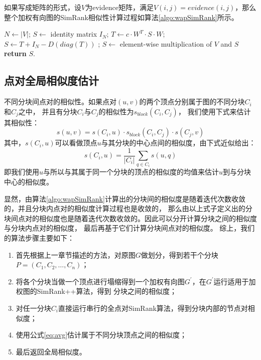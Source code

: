 \documentclass[master]{njuthesis}
\begin{document}
如果写成矩阵的形式，设$V$为evidence矩阵，满足$V(i,j)=evidence(i,j)$，那么整个加权有向图的SimRank相似性计算过程如算法\ref{algo:wapSimRank}所示。
\begin{algorithm}[h]
\label{algo:wapSimRank}
\begin{algorithmic}[1]
	\State $N \gets |V|$;
	\State $S \gets$ identity matrix $I_N$;
		\State $T \gets c\cdot W^T \cdot S \cdot W$;
		\State $S \gets T + I_N -D(diag(T))$ ;
	\EndFor
	\State $S \gets$ element-wise multiplication of $V$ and $S$
	\State \textbf{return} $S$.
\EndProcedure
\end{algorithmic}
\end{algorithm}
\subsection{点对全局相似度估计}

\begin{definition}
 不同分块间点对的相似性。如果点对$(u,v)$的两个顶点分别属于图的不同分块$C_i$和$C_j$之中，
 并且有分块$C_i$与$C_j$的相似性为$s_{block}(C_i, C_j)$，
 我们使用下式来估计其相似性：
 \begin{equation}
 \label{eq:avg}
    s(u,v) = s(C_i, u) \cdot s_{block}(C_i, C_j) \cdot s(C_j, v)
   \end{equation}
  其中，$s(C_i, u)$可以看做顶点$u$与其分块的中心点间的相似度，由下式近似给出：
  \begin{equation}
    s(C_i, u) = \frac{1}{|C_i|}\sum_{q \in C_i}{s(u,q)}
   \end{equation}
   即我们使用$u$与所以与其属于同一个分块的顶点的相似度的均值来估计$u$到与分块中心的相似度。
\end{definition}
显然，由算法\ref{algo:wapSimRank}计算出的分块间的相似度是随着迭代次数收敛的，并且分块内点对的相似度计算过程也是收敛的，
那么由以上式子定义出的分块间点对的相似度也是随着迭代次数收敛的。因此可以分开计算分块之间的相似度与分块内点对的相似度，
最后再基于它们计算分块间点对的相似度。
综上，我们的算法步骤主要如下：
\begin{enumerate}
 \item 首先根据上一章节描述的方法，对原图$G$做划分，得到若干个分块$P=(C_1, C_2, \dots, C_n)$；
 \item 将各个分块当做一个顶点进行塌缩得到一个加权有向图$G^\prime$，在$G^\prime$运行适用于加权图的SimRank++算法，得到
 分块之间的相似度；
 \item 对任一分块$C_i$直接运行串行的全点对SimRank算法，得到分块内部的节点对相似度；
 \item 使用公式\ref{eq:avg}估计属于不同分块顶点之间的相似度；
 \item 最后返回全局相似度。
\end{enumerate}
\end{document}

